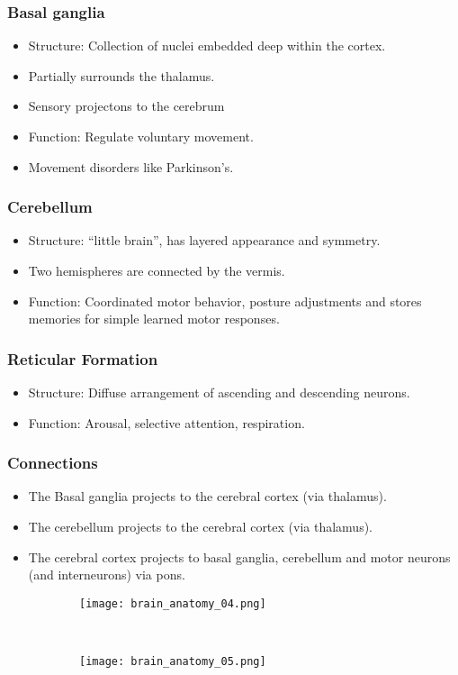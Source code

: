 \documentclass[main]{subfiles}
\begin{document}
\subsubsection{Basal ganglia}
\begin{itemize}[noitemsep,nolistsep]
	\item Structure: Collection of nuclei embedded deep within the cortex.
	\item Partially surrounds the thalamus.
	\item Sensory projectons to the cerebrum
	\item Function: Regulate voluntary movement.
	\item Movement disorders like Parkinson's.
\end{itemize}
\subsubsection{Cerebellum}
\begin{itemize}[noitemsep,nolistsep]
	\item Structure: ``little brain'', has layered appearance and symmetry.
	\item Two hemispheres are connected by the vermis.
	\item Function: Coordinated motor behavior, posture adjustments and stores memories for simple learned motor responses.
\end{itemize}
\subsubsection{Reticular Formation}
\begin{itemize}[noitemsep,nolistsep]
	\item Structure: Diffuse arrangement of ascending and descending neurons.
	\item Function: Arousal, selective attention, respiration.
\end{itemize}
\subsubsection{Connections}
\begin{itemize}[noitemsep,nolistsep]
	\item The Basal ganglia projects to the cerebral cortex (via thalamus).
	\item The cerebellum projects to the cerebral cortex (via thalamus).
	\item The cerebral cortex projects to basal ganglia, cerebellum and motor neurons (and interneurons) via  pons.
\end{itemize}
\begin{figure}[H]
	\centering
	\begin{subfigure}[b]{0.5\textwidth}
		\centering
		\texttt{[image: brain\_anatomy\_04.png]}
	\end{subfigure}%
	~
	\begin{subfigure}[b]{0.5\textwidth}
		\centering
		\texttt{[image: brain\_anatomy\_05.png]}
	\end{subfigure}
\end{figure}
\end{document}
